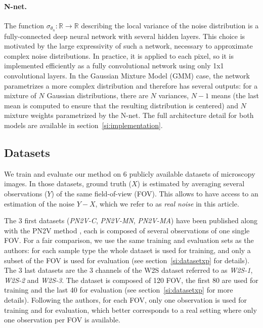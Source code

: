 \documentclass{article}
\begin{document}
\paragraph{N-net.}
The function $\sigma_{\theta_n}: \mathbb{R} \to \mathbb{R}$ describing the local variance of the noise distribution is a fully-connected deep neural network with several hidden layers. This choice is motivated by the large expressivity of such a network, necessary to approximate complex noise distributions. In practice, it is applied to each pixel, so it is implemented efficiently as a fully convolutional network using only 1x1 convolutional layers. In the Gaussian Mixture Model (GMM) case, the network parametrizes a more complex distribution and therefore has several outputs: for a mixture of $N$ Gaussian distributions, there are $N$ variances, $N-1$ means (the last mean is computed to ensure that the resulting distribution is centered) and $N$ mixture weights parametrized by the N-net. The full architecture detail for both models are available in section~\ref{si:implementation}.


\subsection{Datasets}
\label{sec:datasets}
We train and evaluate our method on 6 publicly available datasets of microscopy images. In those datasets, ground truth ($X$) is estimated by averaging several observations ($Y$) of the same field-of-view (FOV).
This allows to have access to an estimation of the noise $Y-X$, which we refer to as \textit{real noise} in this article.

The 3 first datasets (\emph{PN2V-C}, \emph{PN2V-MN}, \emph{PN2V-MA}) have been published along with the PN2V method \cite{krull2019probabilistic}, each is composed of several observations of one single FOV.
For a fair comparison, we use the same training and evaluation sets as the authors: for each sample type the whole dataset is used for training, and only a subset of the FOV is used for evaluation (see section~\ref{si:datasetxp} for details).
The 3 last datasets are the 3 channels of the W2S dataset \cite{zhou2020w2s} referred to as \emph{W2S-1}, \emph{W2S-2} and \emph{W2S-3}.
The dataset is composed of 120 FOV, the first 80 are used for training and the last 40 for evaluation (see section~\ref{si:datasetxp} for more details).
Following the authors, for each FOV, only one observation is used for training and for evaluation, which better corresponds to a real setting where only one observation per FOV is available.
\end{document}
